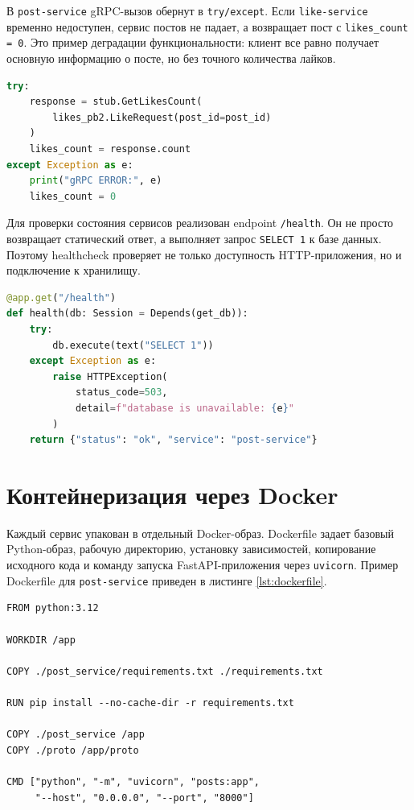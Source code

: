 В \texttt{post-service} gRPC-вызов обернут в \texttt{try/except}. Если \texttt{like-service}
временно недоступен, сервис постов не падает, а возвращает пост с \texttt{likes\_count = 0}.
Это пример деградации функциональности: клиент все равно получает основную информацию о посте,
но без точного количества лайков.

\begin{lstlisting}[language=Python, caption={Обработка ошибки gRPC-вызова}, label={lst:grpc-fallback}]
try:
    response = stub.GetLikesCount(
        likes_pb2.LikeRequest(post_id=post_id)
    )
    likes_count = response.count
except Exception as e:
    print("gRPC ERROR:", e)
    likes_count = 0
\end{lstlisting}

Для проверки состояния сервисов реализован endpoint \texttt{/health}. Он не просто возвращает
статический ответ, а выполняет запрос \texttt{SELECT 1} к базе данных. Поэтому healthcheck
проверяет не только доступность HTTP-приложения, но и подключение к хранилищу.

\begin{lstlisting}[language=Python, caption={Проверка состояния сервиса}, label={lst:health}]
@app.get("/health")
def health(db: Session = Depends(get_db)):
    try:
        db.execute(text("SELECT 1"))
    except Exception as e:
        raise HTTPException(
            status_code=503,
            detail=f"database is unavailable: {e}"
        )
    return {"status": "ok", "service": "post-service"}
\end{lstlisting}

\section{Контейнеризация через Docker}

Каждый сервис упакован в отдельный Docker-образ. Dockerfile задает базовый Python-образ,
рабочую директорию, установку зависимостей, копирование исходного кода и команду запуска
FastAPI-приложения через \texttt{uvicorn}. Пример Dockerfile для \texttt{post-service} приведен
в листинге \ref{lst:dockerfile}.

\begin{lstlisting}[caption={Dockerfile сервиса постов}, label={lst:dockerfile}]
FROM python:3.12

WORKDIR /app

COPY ./post_service/requirements.txt ./requirements.txt

RUN pip install --no-cache-dir -r requirements.txt

COPY ./post_service /app
COPY ./proto /app/proto

CMD ["python", "-m", "uvicorn", "posts:app",
     "--host", "0.0.0.0", "--port", "8000"]
\end{lstlisting}


